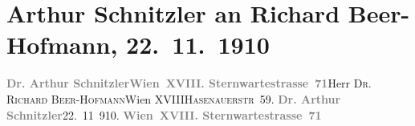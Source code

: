 

         
         \renewcommand{\erwaehntePersonen}{Personen: Richard Beer-Hofmann, Julius Schnitzler}
         \renewcommand{\erwaehnteOrte}{Orte: Burgtheater, Hasenauerstraße, Sternwartestraße, Wien, XVIII., Währing}
         \renewcommand{\erwaehnteWerke}{Werke: Das Echo des Lebens, Der Ruf des Lebens. Schauspiel in drei Akten, Der junge Medardus. Dramatische Historie in einem Vorspiel und fünf Aufzügen}
               \section[Arthur Schnitzler an Richard Beer-Hofmann, 22. 11. 1910]{ Arthur Schnitzler an Richard Beer-Hofmann, 22. 11. 1910}\nopagebreak{}\rehead{ }\begin{ledgroupsized}[t]{13cm}\normalsize\beginnumbering \toendnotes[C]{\smallbreak\pagebreak[2]} 
\toendnotes[C]{\smallbreak}\pstart{}{\pb}\textcolor{gray}{\textbf{Dr. Arthur Schnitzler}}\pend{}\pstart{}\textcolor{gray}{\textbf{Wien XVIII. Sternwartestrasse 71}}\pend{}{\bigskip}\pstart{}{\pb}Herr \textsc{Dr. Richard
                     Beer-Hofmann}\pend{}\pstart{}Wien XVIII\pend{}\pstart{}\textsc{Hasenauerstr 59}.\pend{}{\bigskip}\pstart
           \noindent{}{\pb}\textcolor{gray}{\textbf{Dr. Arthur Schnitzler}}\hfill 22. 11 910.\pend
           \pstart
           \textcolor{gray}{\textbf{Wien XVIII. Sternwartestrasse 71}}\pend
           \pstart

\end{ledgroupsized}
